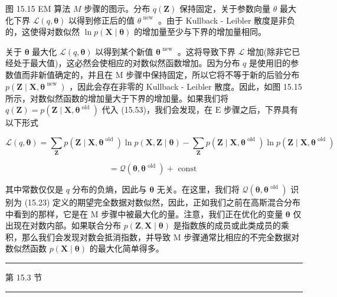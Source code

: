 \documentclass[10pt]{report}
\newcommand{\HRule}{\begin{center}\rule{0.9\linewidth}{0.2mm}\end{center}}
\begin{document}
图 15.15 EM 算法 \(M\) 步骤的图示。分布 \(q\left( \mathbf{Z}\right)\) 保持固定，关于参数向量 \(\theta\) 最大化下界 \(\mathcal{L}\left( {q,\mathbf{\theta }}\right)\) 以得到修正后的值 \({\theta }^{\text{ new }}\) 。由于 Kullback - Leibler 散度是非负的，这使得对数似然 \(\ln p\left( {\mathbf{X} \mid  \mathbf{\theta }}\right)\) 的增加量至少与下界的增加量相同。

关于 \(\mathbf{\theta }\) 最大化 \(\mathcal{L}\left( {q,\mathbf{\theta }}\right)\) 以得到某个新值 \({\mathbf{\theta }}^{\text{ new }}\) 。这将导致下界 \(\mathcal{L}\) 增加(除非它已经处于最大值)，这必然会使相应的对数似然函数增加。因为分布 \(q\) 是使用旧的参数值而非新值确定的，并且在 \(\mathrm{M}\) 步骤中保持固定，所以它将不等于新的后验分布 \(p\left( {\mathbf{Z} \mid  \mathbf{X},{\mathbf{\theta }}^{\text{ new }}}\right)\) ，因此会存在非零的 Kullback - Leibler 散度。因此，如图 15.15 所示，对数似然函数的增加量大于下界的增加量。如果我们将 \(q\left( \mathbf{Z}\right)  = p\left( {\mathbf{Z} \mid  \mathbf{X},{\mathbf{\theta }}^{\text{ old }}}\right)\) 代入 (15.53)，我们会发现，在 \(\mathrm{E}\) 步骤之后，下界具有以下形式

\[
\mathcal{L}\left( {q,\mathbf{\theta }}\right)  = \mathop{\sum }\limits_{\mathbf{Z}}p\left( {\mathbf{Z} \mid  \mathbf{X},{\mathbf{\theta }}^{\text{ old }}}\right) \ln p\left( {\mathbf{X},\mathbf{Z} \mid  \mathbf{\theta }}\right)  - \mathop{\sum }\limits_{\mathbf{Z}}p\left( {\mathbf{Z} \mid  \mathbf{X},{\mathbf{\theta }}^{\text{ old }}}\right) \ln p\left( {\mathbf{Z} \mid  \mathbf{X},{\mathbf{\theta }}^{\text{ old }}}\right)
\]

\[
= \mathcal{Q}\left( {\mathbf{\theta },{\mathbf{\theta }}^{\text{ old }}}\right)  + \text{ const } \tag{15.56}
\]

其中常数仅仅是 \(q\) 分布的负熵，因此与 \(\mathbf{\theta }\) 无关。在这里，我们将 \(\mathcal{Q}\left( {\mathbf{\theta },{\mathbf{\theta }}^{\text{ old }}}\right)\) 识别为 (15.23) 定义的期望完全数据对数似然，因此，正如我们之前在高斯混合分布中看到的那样，它是在 M 步骤中被最大化的量。注意，我们正在优化的变量 \(\mathbf{\theta }\) 仅出现在对数内部。如果联合分布 \(p\left( {\mathbf{Z},\mathbf{X} \mid  \mathbf{\theta }}\right)\) 是指数族的成员或此类成员的乘积，那么我们会发现对数会抵消指数，并导致 \(\mathrm{M}\) 步骤通常比相应的不完全数据对数似然函数 \(p\left( {\mathbf{X} \mid  \mathbf{\theta }}\right)\) 的最大化简单得多。

\HRule

第 15.3 节

\HRule
\end{document}
